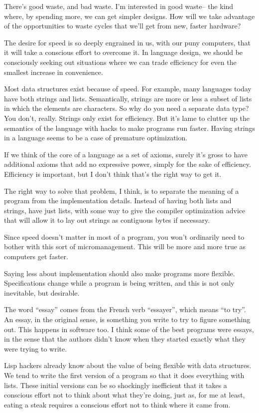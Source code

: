 There's good waste, and bad waste. I'm interested in good waste-- the
kind where, by spending more, we can get simpler designs. How will we
take advantage of the opportunities to waste cycles that we'll get from
new, faster hardware?

The desire for speed is so deeply engrained in us, with our puny
computers, that it will take a conscious effort to overcome it. In
language design, we should be consciously seeking out situations where
we can trade efficiency for even the smallest increase in convenience.

Most data structures exist because of speed. For example, many languages
today have both strings and lists. Semantically, strings are more or
less a subset of lists in which the elements are characters. So why do
you need a separate data type? You don't, really. Strings only exist for
efficiency. But it's lame to clutter up the semantics of the language
with hacks to make programs run faster. Having strings in a language
seems to be a case of premature optimization.

If we think of the core of a language as a set of axioms, surely it's
gross to have additional axioms that add no expressive power, simply for
the sake of efficiency. Efficiency is important, but I don't think
that's the right way to get it.

The right way to solve that problem, I think, is to separate the meaning
of a program from the implementation details. Instead of having both
lists and strings, have just lists, with some way to give the compiler
optimization advice that will allow it to lay out strings as contiguous
bytes if necessary.

Since speed doesn't matter in most of a program, you won't ordinarily
need to bother with this sort of micromanagement. This will be more and
more true as computers get faster.

Saying less about implementation should also make programs more
flexible. Specifications change while a program is being written, and
this is not only inevitable, but desirable.

The word ``essay'' comes from the French verb ``essayer'', which means
``to try''. An essay, in the original sense, is something you write to
try to figure something out. This happens in software too. I think some
of the best programs were essays, in the sense that the authors didn't
know when they started exactly what they were trying to write.

Lisp hackers already know about the value of being flexible with data
structures. We tend to write the first version of a program so that it
does everything with lists. These initial versions can be so shockingly
inefficient that it takes a conscious effort not to think about what
they're doing, just as, for me at least, eating a steak requires a
conscious effort not to think where it came from.

